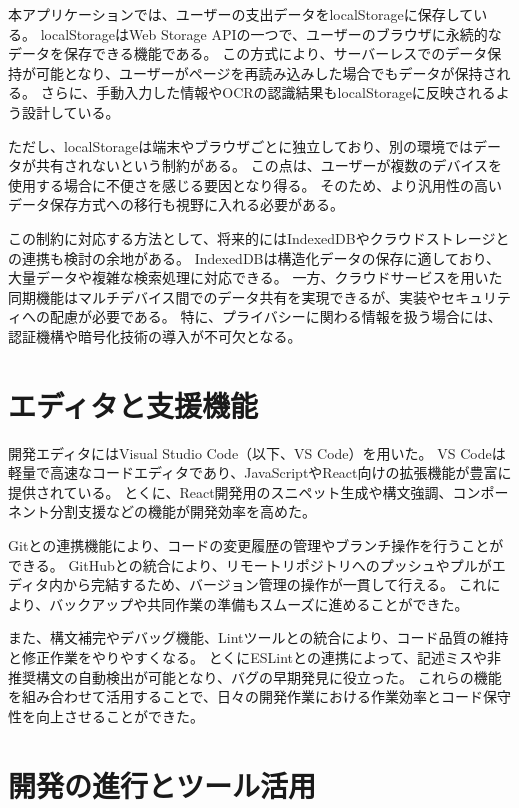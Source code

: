 \documentclass[main]{subfiles}
\begin{document}
本アプリケーションでは、ユーザーの支出データをlocalStorageに保存している。  
localStorageはWeb Storage APIの一つで、ユーザーのブラウザに永続的なデータを保存できる機能である。  
この方式により、サーバーレスでのデータ保持が可能となり、ユーザーがページを再読み込みした場合でもデータが保持される。  
さらに、手動入力した情報やOCRの認識結果もlocalStorageに反映されるよう設計している。

ただし、localStorageは端末やブラウザごとに独立しており、別の環境ではデータが共有されないという制約がある。  
この点は、ユーザーが複数のデバイスを使用する場合に不便さを感じる要因となり得る。  
そのため、より汎用性の高いデータ保存方式への移行も視野に入れる必要がある。

この制約に対応する方法として、将来的にはIndexedDBやクラウドストレージとの連携も検討の余地がある。  
IndexedDBは構造化データの保存に適しており、大量データや複雑な検索処理に対応できる。  
一方、クラウドサービスを用いた同期機能はマルチデバイス間でのデータ共有を実現できるが、実装やセキュリティへの配慮が必要である。  
特に、プライバシーに関わる情報を扱う場合には、認証機構や暗号化技術の導入が不可欠となる。

\section{エディタと支援機能}

開発エディタにはVisual Studio Code（以下、VS Code）を用いた。  
VS Codeは軽量で高速なコードエディタであり、JavaScriptやReact向けの拡張機能が豊富に提供されている。  
とくに、React開発用のスニペット生成や構文強調、コンポーネント分割支援などの機能が開発効率を高めた。

Gitとの連携機能により、コードの変更履歴の管理やブランチ操作を行うことができる。  
GitHubとの統合により、リモートリポジトリへのプッシュやプルがエディタ内から完結するため、バージョン管理の操作が一貫して行える。  
これにより、バックアップや共同作業の準備もスムーズに進めることができた。

また、構文補完やデバッグ機能、Lintツールとの統合により、コード品質の維持と修正作業をやりやすくなる。  
とくにESLintとの連携によって、記述ミスや非推奨構文の自動検出が可能となり、バグの早期発見に役立った。  
これらの機能を組み合わせて活用することで、日々の開発作業における作業効率とコード保守性を向上させることができた。

\section{開発の進行とツール活用}
\end{document}
